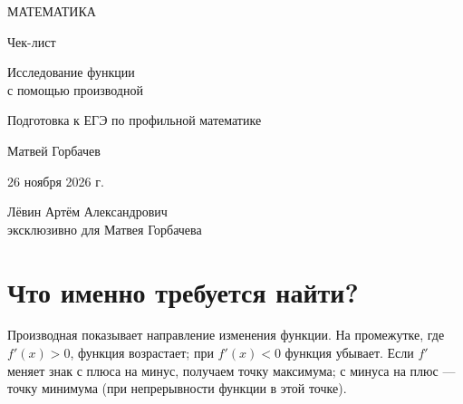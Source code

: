 \documentclass[a4paper,12pt]{article}
\newcommand{\topic}[1]{\section{\textcolor{darkaccent}{#1}}}
\begin{document}
\begin{titlepage}
\centering
\vspace*{26mm}
{\Large\color{darkaccent} МАТЕМАТИКА\par}
\vspace{16mm}
{\huge Чек-лист\par}
\vspace{10mm}
{\LARGE\color{accent} Исследование функции\\ с помощью производной\par}
\vspace{17mm}
{\large Подготовка к ЕГЭ по профильной математике\par}
\vfill
{\large Матвей Горбачев\par}
\vspace{10mm}
{\large 26 ноября 2026 г.\par}
\vspace{18mm}
{\small Лёвин Артём Александрович\\ эксклюзивно для Матвея Горбачева\par}
\vspace{18mm}
\end{titlepage}
\setcounter{page}{1}
\topic{Что именно требуется найти?}
Производная показывает направление изменения функции. На промежутке, где $f'(x)>0$, функция возрастает; при $f'(x)<0$ функция убывает. Если $f'$ меняет знак с плюса на минус, получаем точку максимума; с минуса на плюс --- точку минимума (при непрерывности функции в этой точке).
\end{document}
